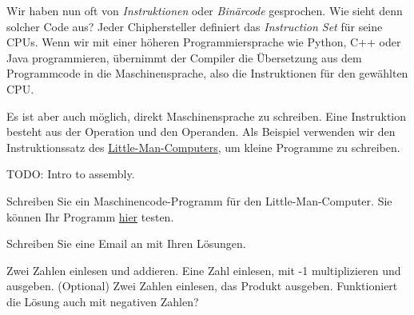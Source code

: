 Wir haben nun oft von \emph{Instruktionen} oder \emph{Binärcode} gesprochen. Wie sieht denn solcher Code aus? Jeder Chiphersteller definiert das \emph{Instruction Set} für seine CPUs. Wenn wir mit einer höheren Programmiersprache wie Python, C++ oder Java programmieren, übernimmt der Compiler die Übersetzung aus dem Programmcode in die Maschinensprache, also die Instruktionen für den gewählten CPU.

Es ist aber auch möglich, direkt Maschinensprache zu schreiben. Eine Instruktion besteht aus der Operation und den Operanden. Als Beispiel verwenden wir den Instruktionssatz des \href{https://en.wikipedia.org/wiki/Little_man_computer}{Little-Man-Computers}, um kleine Programme zu schreiben.

TODO: Intro to assembly.


\begin{question}
    Schreiben Sie ein Maschinencode-Programm für den Little-Man-Computer. Sie können Ihr Programm \href{https://oinf.ch/interactive/little-man-computer/}{hier} testen.

    Schreiben Sie eine Email an \mail mit Ihren Lösungen.
    \begin{tasks}
        \task Zwei Zahlen einlesen und addieren. 
        \task Eine Zahl einlesen, mit -1 multiplizieren und ausgeben.
        \task (Optional) Zwei Zahlen einlesen, das Produkt ausgeben. Funktioniert die Lösung auch mit negativen Zahlen?
    \end{tasks}
\end{question}
